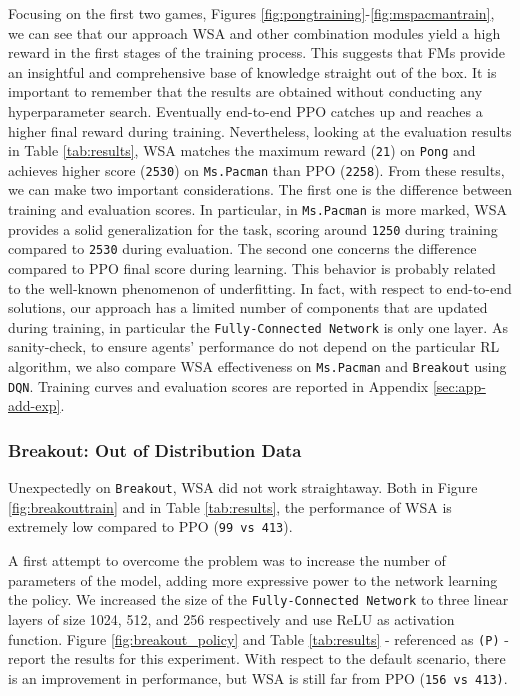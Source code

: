 Focusing on the first two games, Figures \ref{fig:pongtraining}-\ref{fig:mspacmantrain}, we can see that our approach WSA and other combination modules yield a high reward in the first stages of the training process. This suggests that FMs provide an insightful and comprehensive base of knowledge straight out of the box.
It is important to remember that the results are obtained without conducting any hyperparameter search. Eventually end-to-end PPO catches up and reaches a higher final reward during training. Nevertheless, looking at the evaluation results in Table \ref{tab:results}, WSA matches the maximum reward (\texttt{21}) on \texttt{Pong} and achieves higher score (\texttt{2530}) on \texttt{Ms.Pacman} than PPO (\texttt{2258}). From these results, we can make two important considerations. The first one is the difference between training and evaluation scores. In particular, in \texttt{Ms.Pacman} is more marked, WSA provides a solid generalization for the task, scoring around \texttt{1250} during training compared to \texttt{2530} during evaluation. The second one concerns the difference compared to PPO final score during learning. This behavior is probably related to the well-known phenomenon of underfitting. In fact, with respect to end-to-end solutions, our approach has a limited number of components that are updated during training, in particular the \texttt{Fully-Connected Network} is only one layer. As sanity-check, to ensure agents' performance do not depend on the particular RL algorithm, we also compare WSA effectiveness on \texttt{Ms.Pacman} and \texttt{Breakout} using \texttt{DQN}. Training curves and evaluation scores are reported in Appendix \ref{sec:app-add-exp}.

\subsubsection{Breakout: Out of Distribution Data}\label{sec:breakout_study}
Unexpectedly on \texttt{Breakout}, WSA did not work straightaway. Both in Figure \ref{fig:breakouttrain} and in Table \ref{tab:results}, the performance of WSA is extremely low compared to PPO (\texttt{99 vs 413}).

A first attempt to overcome the problem was to increase the number of parameters of the model, adding more expressive power to the network learning the policy. We increased the size of the \texttt{Fully-Connected Network} to three linear layers of size 1024, 512, and 256 respectively and use ReLU as activation function. Figure \ref{fig:breakout_policy} and Table \ref{tab:results} - referenced as \texttt{(P)} - report the results for this experiment. With respect to the default scenario, there is an improvement in performance, but WSA is still far from PPO (\texttt{156 vs 413)}.


